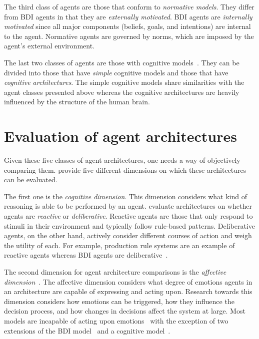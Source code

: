 The third class of agents are those that conform to \textit{normative models}.
They differ from BDI agents in that they are \textit{externally motivated}.
BDI agents are \textit{internally motivated} since all major components (beliefs, goals, and intentions) are internal to the agent.
Normative agents are governed by norms, which are imposed by the agent's external environment.

The last two classes of agents are those with cognitive models~\citep{balke_how_2014}.
They can be divided into those that have \textit{simple} cognitive models and those that have \textit{cognitive architectures}.
The simple cognitive models share similarities with the agent classes presented above
whereas the cognitive architectures are heavily influenced by the structure of the human brain.

\section{Evaluation of agent architectures}
\label{sec:agent_evaluation}

Given these five classes of agent architectures, one needs a way of objectively comparing them.
\citet{balke_how_2014} provide five different dimensions on which these architectures can be evaluated.

The first one is the \textit{cognitive dimension}.
This dimension considers what kind of reasoning is able to be performed by an agent.
\citeauthor{balke_how_2014} evaluate architectures on whether agents are \textit{reactive} or \textit{deliberative}.
Reactive agents are those that only respond to stimuli in their environment and typically follow rule-based patterns.
Deliberative agents, on the other hand, actively consider different courses of action and weigh the utility of each.
For example, production rule systems are an example of reactive agents whereas BDI agents are deliberative~\citep{balke_how_2014}.

The second dimension for agent architecture comparisons is the \textit{affective dimension}~\citep{balke_how_2014}.
The affective dimension considers what degree of emotions agents in an architecture are capable of expressing and acting upon.
Research towards this dimension considers how emotions can be triggered, how they influence the decision process, and how changes in decisions affect the system at large.
Most models are incapable of acting upon emotions~\citep{balke_how_2014} with the exception of two extensions of the BDI model~\citep{jiang_ebdi_2007, dignum_towards_2009} and a cognitive model~\citep{urban_pecs_2000}.

